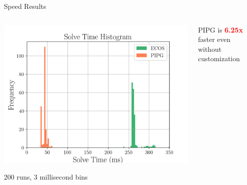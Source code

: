 \documentclass[aspectratio=169]{beamer}
\begin{document}
\begin{frame}{Speed Results}


    \begin{columns}[T]
        \begin{column}{.6\textwidth}
            \includegraphics[width=\linewidth]{img/solve_speed.png}\begin{center}
                {200 runs, 3 millisecond bins}
            \end{center}
        \end{column}
        \begin{column}{.4\textwidth}
            \begin{center}

                \vspace{0.5cm}

            \end{center} 
            
            PIPG is \textbf{\textcolor{red}{6.25x}} faster even without customization

        \end{column}
    \end{columns}
\end{frame}
\end{document}
